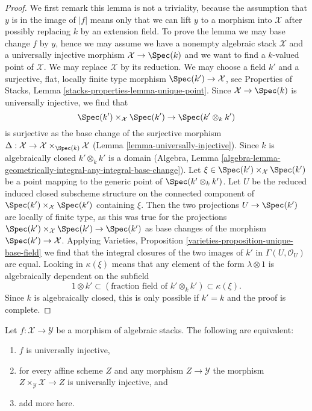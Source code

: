\begin{proof}
We first remark this lemma is not a triviality, because the assumption that
$y$ is in the image of $|f|$ means only that we can lift
$y$ to a morphism into $\mathcal{X}$ after possibly replacing
$k$ by an extension field. To prove the lemma we may base change
$f$ by $y$, hence we may assume we have a nonempty algebraic stack
$\mathcal{X}$ and a universally injective morphism
$\mathcal{X} \to \Spec(k)$ and we want to find a $k$-valued point
of $\mathcal{X}$. We may replace $\mathcal{X}$ by its reduction.
We may choose a field $k'$ and a surjective, flat, locally finite type morphism
$\Spec(k') \to \mathcal{X}$, see
Properties of Stacks, Lemma \ref{stacks-properties-lemma-unique-point}.
Since $\mathcal{X} \to \Spec(k)$ is universally injective, we find that
$$
\Spec(k') \times_\mathcal{X} \Spec(k') \to \Spec(k' \otimes_k k')
$$
is surjective as the base change of the surjective morphism
$\Delta : \mathcal{X} \to \mathcal{X} \times_{\Spec(k)} \mathcal{X}$
(Lemma \ref{lemma-universally-injective}).
Since $k$ is algebraically closed $k' \otimes_k k'$ is a domain
(Algebra, Lemma
\ref{algebra-lemma-geometrically-integral-any-integral-base-change}).
Let $\xi \in \Spec(k') \times_\mathcal{X} \Spec(k')$
be a point mapping to the generic point of $\Spec(k' \otimes_k k')$.
Let $U$ be the reduced induced closed subscheme structure on
the connected component of $\Spec(k') \times_\mathcal{X} \Spec(k')$
containing $\xi$. Then the two projections $U \to \Spec(k')$
are locally of finite type, as this was true for the projections
$\Spec(k') \times_\mathcal{X} \Spec(k') \to \Spec(k')$
as base changes of the morphism $\Spec(k') \to \mathcal{X}$.
Applying
Varieties, Proposition \ref{varieties-proposition-unique-base-field}
we find that the integral closures of the two images
of $k'$ in $\Gamma(U, \mathcal{O}_U)$ are equal.
Looking in $\kappa(\xi)$ means that any element of the form
$\lambda \otimes 1$ is algebraically dependent on
the subfield
$$
1 \otimes k' \subset 
(\text{fraction field of }k' \otimes_k k') \subset
\kappa(\xi).
$$
Since $k$ is algebraically closed, this is only possible
if $k' = k$ and the proof is complete.
\end{proof}

\begin{lemma}
\label{lemma-universally-injective-local}
Let $f : \mathcal{X} \to \mathcal{Y}$ be a morphism of algebraic stacks.
The following are equivalent:
\begin{enumerate}
\item $f$ is universally injective,
\item for every affine scheme $Z$ and any morphism
$Z \to \mathcal{Y}$ the morphism $Z \times_\mathcal{Y} \mathcal{X} \to Z$
is universally injective, and
\item add more here.
\end{enumerate}
\end{lemma}

